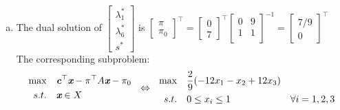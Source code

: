 \begin{enumerate}
\begin{enumerate}[(a)]
	\item The dual solution of $\begin{bmatrix}
	\lambda_1^*\\\lambda_6^*\\s^*
	\end{bmatrix}$ is $\begin{bmatrix}
	\pi\\\pi_0
	\end{bmatrix}^\top = \begin{bmatrix}
	0\\7
	\end{bmatrix}^\top \begin{bmatrix}
	0 & 9 \\
	1 & 1 \\
	\end{bmatrix}^{-1} = \begin{bmatrix}
	7/9\\0
	\end{bmatrix}^\top$\\
	The corresponding subproblem:
	\[
	\begin{aligned}
	\max \quad &\textit{\textbf{c}}^\top \textit{\textbf{x}} - \pi^\top A\textit{\textbf{x}} -\pi_0\\
	s.t. \quad &\textit{\textbf{x}} \in X
	\end{aligned} ~~\Leftrightarrow~~ \begin{aligned}
	\max \quad &\dfrac{2}{9}(-12x_1-x_2+12x_3)\\
	s.t.\quad & 0\le x_i\le 1&\forall i=1,2,3
	\end{aligned}
	\]
	
\end{enumerate}
\end{enumerate}